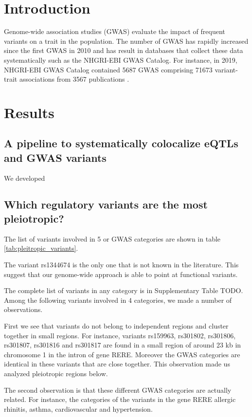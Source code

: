 \section*{Introduction}\label{sec:introduction}

Genome-wide association studies (GWAS) evaluate the impact of frequent variants on a trait in the population.
%
The number of GWAS has rapidly increased since the first GWAS in 2010 and has result in databases that collect these data systematically such as the NHGRI-EBI GWAS Catalog.
%
For instance, in 2019, NHGRI-EBI GWAS Catalog contained 5687 GWAS comprising 71673 variant-trait associations from 3567 publications \citep{}.

\section*{Results}\label{s:results}

\subsection*{A pipeline to systematically colocalize eQTLs and GWAS variants}

We developed 

\subsection*{Which regulatory variants are the most pleiotropic?}

The list of variants involved in 5 or GWAS categories are shown in table \ref{tab:pleitropic_variants}. 

The variant rs1344674 is the only one that is not known in the literature.
This suggest that our genome-wide approach is able to point at functional variants.

The complete list of variants in any category is in Supplementary Table TODO.
Among the following variants involved in 4 categories, we made a number of observations.

First we see that variants do not belong to independent regions and cluster together in small regions.
For instance, variants rs159963, rs301802, rs301806, rs301807, rs301816 and rs301817 are found in a small region of around 23 kb in chromosome 1 in the intron of gene RERE.
Moreover the GWAS categories are identical in these variants that are close together.
This observation made us analyzed pleiotropic regions below.

The second observation is that these different GWAS categories are actually related.
For instance, the categories of the variants in the gene RERE allergic rhinitis, asthma, cardiovascular and hypertension.

